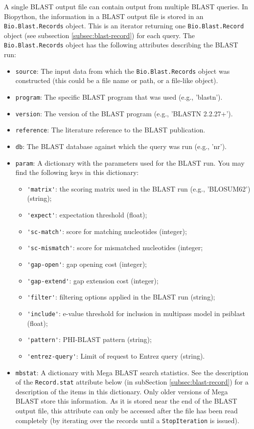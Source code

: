 A single BLAST output file can contain output from multiple BLAST queries.
In Biopython, the information in a BLAST output file is stored in an \verb|Bio.Blast.Records| object. This is an iterator returning one \verb|Bio.Blast.Record| object (see subsection \ref{subsec:blast-record}) for each query. The \verb|Bio.Blast.Records| object has the following attributes describing the BLAST run:
\begin{itemize}
\item \verb|source|: The input data from which the \verb|Bio.Blast.Records| object was constructed (this could be a file name or path, or a file-like object).
\item \verb|program|: The specific BLAST program that was used (e.g., 'blastn').
\item \verb|version|: The version of the BLAST program (e.g., 'BLASTN 2.2.27+').
\item \verb|reference|:  The literature reference to the BLAST publication.
\item \verb|db|: The BLAST database against which the query was run (e.g., 'nr').
\item \verb|param|: A dictionary with the parameters used for the BLAST run. You may find the following keys in this dictionary:
\begin{itemize}
\item \verb|'matrix'|: the scoring matrix used in the BLAST run (e.g., 'BLOSUM62') (string);
\item \verb|'expect'|: expectation threshold (float);
\item \verb|'sc-match'|: score for matching nucleotides (integer);
\item \verb|'sc-mismatch'|: score for mismatched nucleotides (integer;
\item \verb|'gap-open'|: gap opening cost (integer);
\item \verb|'gap-extend'|: gap extension cost (integer);
\item \verb|'filter'|: filtering options applied in the BLAST run (string);
\item \verb|'include'|: e-value threshold for inclusion in multipass model in psiblast (float);
\item \verb|'pattern'|: PHI-BLAST pattern (string);
\item \verb|'entrez-query'|: Limit of request to Entrez query (string).
\end{itemize}
\item \verb|mbstat|: A dictionary with Mega BLAST search statistics. See the description of the \verb|Record.stat| attribute below (in subSection \ref{subsec:blast-record}) for a description of the items in this dictionary. Only older versions of Mega BLAST store this information. As it is stored near the end of the BLAST output file, this attribute can only be accessed after the file has been read completely (by iterating over the records until a \verb|StopIteration| is issued).
\end{itemize}

